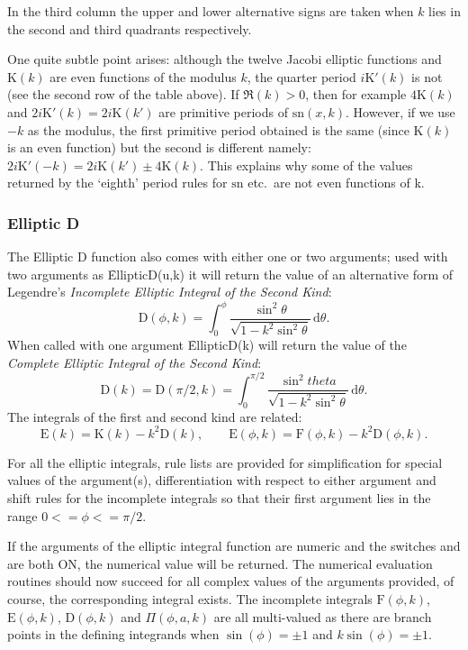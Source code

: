 In the third column the upper and lower alternative signs are taken when
$k$ lies in the second and third quadrants respectively.

One quite subtle point arises: although the twelve Jacobi elliptic functions
and $\mathrm{K}(k)$ are even functions of the modulus $k$, the quarter period
$i\mathrm{K}'(k)$ is not (see the second row of the table above).
If $\Re(k)>0$, then for example
$4\mathrm{K}(k)$ and  $2i\mathrm{K}'(k)=2i\mathrm{K}(k')$ are
primitive periods of $\mathrm{sn}(x,k)$. However, if we use $-k$ as the modulus,
the first primitive period obtained is the same (since $\mathrm{K}(k)$ is an
even function) but the second is different namely:
$2i\mathrm{K}'(-k)=2i\mathrm{K}(k') \pm 4\mathrm{K}(k)$.
This explains why some of the values returned by the `eighth' period rules for
$\mathrm{sn}$ etc.\ are not even functions of k.

\subsubsection{Elliptic D}
\hypertarget{operator:ELLIPTICD}{}

The Elliptic D function also comes with either one or two arguments;
used with two arguments as \f{EllipticD(u,k)}
it will return the value of an alternative form of Legendre's 
\emph{Incomplete Elliptic Integral of the Second Kind}:
\[\mathrm{D}(\phi, k)=\int_0^\phi\frac{\sin^2 \theta}{\sqrt{1-k^2\sin^2\theta}}
\,\mathrm{d}\theta.\]
When called with one argument \f{EllipticD(k)} will return the value of the
\emph{Complete Elliptic Integral of the Second Kind}:
\[\mathrm{D}(k)=\mathrm{D}(\pi/2, k) =
\int_0^{\pi/2} \frac{\sin^2 theta}{\sqrt{1-k^2 \sin^2 \theta}} \,\mathrm{d}\theta.\]
The integrals of the first and second kind are related:
\[\mathrm{E}(k) = \mathrm{K}(k)-k^2\mathrm{D}(k), \qquad
\mathrm{E}(\phi, k) = \mathrm{F}(\phi, k)-k^2\mathrm{D}(\phi, k).\]

For all the elliptic integrals, rule lists are provided for simplification for
special values of the argument(s), differentiation with respect to either
argument and shift rules for the incomplete integrals so that their first
argument lies in the range  $0 <= \phi <= \pi/2$.

If the arguments of the elliptic integral function are numeric and the switches
 and  are both ON, the numerical value will be returned. The
numerical evaluation routines should now succeed for all complex values of the arguments
provided, of course, the corresponding integral exists. The incomplete integrals
$\mathrm{F}(\phi, k)$, $\mathrm{E}(\phi, k)$, $\mathrm{D}(\phi, k)$ and $\Pi(\phi, a, k)$
are all multi-valued as there are branch points in the  defining integrands  when
$\sin(\phi) =\pm 1$ and $k\sin(\phi) = \pm 1$.

